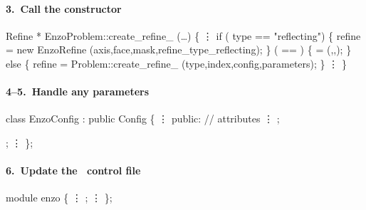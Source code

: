 \begin{frame}[fragile] 
\secframetitle{\ssDevelRefine}
\framesubtitle{3.~Call the  constructor}

\footnotesize
\begin{semiverbatim}
   Refine * EnzoProblem::create_refine_ (\dots)
   \{
         \vdots
   if (       type == "reflecting") \{ 
      refine = new EnzoRefine 
         (axis,face,mask,refine_type_reflecting);
   \}  ( == ) \{
       =   (,,);
   \} else \{
      refine = Problem::create_refine_
         (type,index,config,parameters);
   \}
         \vdots
   \}
\end{semiverbatim}

\end{frame}


\begin{frame}[fragile] 
\secframetitle{\ssDevelRefine}
\framesubtitle{4--5.~Handle any parameters}

\footnotesize
\begin{semiverbatim}
   class EnzoConfig : public Config \{ 
        \vdots
      public: // attributes 
        \vdots 
       ;

      ;
        \vdots 
   \};
\end{semiverbatim}

\end{frame}


\begin{frame}[fragile] 
\secframetitle{\ssDevelRefine}
\framesubtitle{6.~Update the \charm\ control file }

\footnotesize
\begin{semiverbatim}
   module enzo \{
       \vdots
       ;
       \vdots
   \};
\end{semiverbatim}
\end{frame}


